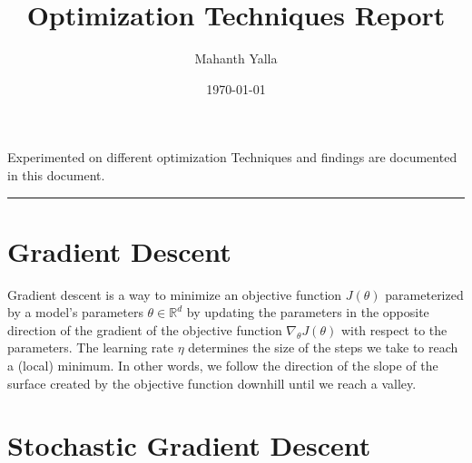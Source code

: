 \documentclass[10pt,twocolumn]{article}
\title{
  \Large Optimization Techniques Report  \\
  [10pt] 
  }
\date{\today}
\author{Mahanth Yalla}
\makeatletter
\renewenvironment{abstract} %
{\small
\begin{center}
  \bfseries \abstractname\vspace{-.5em}\vspace{0pt}
\end{center}
\list{}{%
\setlength{\leftmargin}{0mm}
\setlength{\rightmargin}{\leftmargin}%
}
\item\relax}
{\endlist}
\renewcommand{\maketitle}{\bgroup\setlength{\parindent}{0pt} %
\begin{flushleft}
  \textbf{\@title}
  \@author \\ 
  \@date
\end{flushleft}\egroup
}
\makeatother
\begin{document}
  \twocolumn[ \maketitle ]
  
  \begin{abstract}
    Experimented on different optimization Techniques and findings are documented in this document.
  \end{abstract}
  
  \rule{\linewidth}{0.5pt}
  
  
  \section{Gradient Descent}
  Gradient descent is a way to minimize an objective function $J(\theta)$ parameterized by a model's 
  parameters $\theta \in \mathbb{R}^d$ by updating the parameters in the opposite direction of the gradient 
  of the objective function $ \nabla_{\theta}J(\theta)$ with respect to the parameters. The learning rate $\eta$ 
  determines the size of the steps we take to reach a (local) minimum. In other words, we follow the direction of the slope of the surface created by the objective function downhill until we reach a valley.
  \cite{DBLP:journals/corr/Ruder16}
  
  \section{Stochastic Gradient Descent}
  
  
% 
\printbibliography

 
\end{document}
